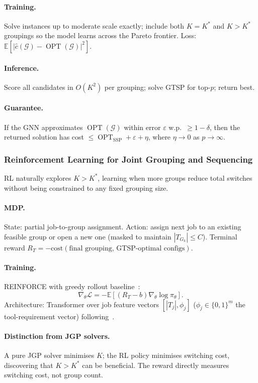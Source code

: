 \documentclass[11pt,a4paper]{article}
\theoremstyle{plain}
\theoremstyle{definition}
\DeclareMathOperator{\OPT}{OPT}
\newcommand{\calG}{\mathcal{G}}
\newcommand{\Kstar}{K^{*}}
\begin{document}
\paragraph{Training.} Solve instances up to moderate scale exactly; include both
$K=\Kstar$ and $K>\Kstar$ groupings so the model learns across the Pareto frontier.
Loss: $\mathbb{E}[|\hat{c}(\calG)-\OPT(\calG)|^2]$.

\paragraph{Inference.} Score all candidates in $O(K^2)$ per grouping; solve GTSP
for top-$p$; return best.

\paragraph{Guarantee.} If the GNN approximates $\OPT(\calG)$ within error $\varepsilon$
w.p.\ $\ge 1-\delta$, then the returned solution has cost
$\le\OPT_{\mathrm{SSP}}+\varepsilon+\eta$, where $\eta\to 0$ as $p\to\infty$.

\subsubsection{Reinforcement Learning for Joint Grouping and Sequencing}
\label{sec:RL}

RL naturally explores $K>\Kstar$, learning when more groups reduce total switches
without being constrained to any fixed grouping size.

\paragraph{MDP.} State: partial job-to-group assignment. Action: assign next job to
an existing feasible group or open a new one (masked to maintain $|T_{G_k}|\le C$).
Terminal reward $R_T=-\mathrm{cost}(\text{final grouping, GTSP-optimal configs})$.

\paragraph{Training.} REINFORCE with greedy rollout baseline~\cite{Kool2019}:
\[
  \nabla_\theta\mathcal{L}=-\mathbb{E}[(R_T-b)\nabla_\theta\log\pi_\theta].
\]
Architecture: Transformer over job feature vectors $[|T_j|,\phi_j]$
($\phi_j\in\{0,1\}^m$ the tool-requirement vector) following~\cite{Kool2019}.

\paragraph{Distinction from JGP solvers.} A pure JGP solver minimises $K$;
the RL policy minimises switching cost, discovering that $K>\Kstar$ can be beneficial.
The reward directly measures switching cost, not group count.
\end{document}
